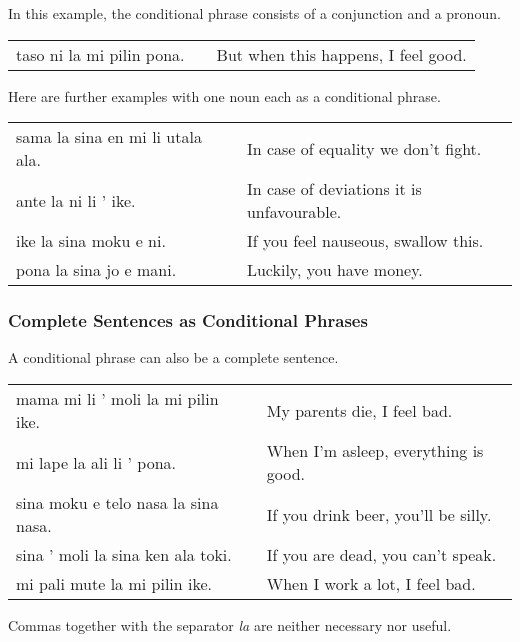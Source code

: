 In this example, the conditional phrase consists of a conjunction and a pronoun.

\begin{supertabular}{p{5,5cm}|ll}
    taso ni la mi pilin pona. &  & But when this happens, I feel good. \\
\end{supertabular}

Here are further examples with one noun each as a conditional phrase.

\begin{supertabular}{p{5,5cm}|ll}
    sama la sina en mi li utala ala. &  & In case of equality we don't fight.       \\
    ante la ni li ' ike.             &  & In case of deviations it is unfavourable. \\
    ike la sina moku e ni.           &  & If you feel nauseous, swallow this.       \\
    pona la sina jo e mani.          &  & Luckily, you have money.                  \\
\end{supertabular}

%
%
\subsubsection*{Complete Sentences as Conditional Phrases}
%
%
A conditional phrase can also be a complete sentence.

\begin{supertabular}{p{5,5cm}|ll}
    mama mi li ' moli la mi pilin ike.  &  & My parents die, I feel bad.          \\
    mi lape la ali li ' pona.           &  & When I'm asleep, everything is good. \\
    sina moku e telo nasa la sina nasa. &  & If you drink beer, you'll be silly.  \\
    sina ' moli la sina ken ala toki.   &  & If you are dead, you can't speak.    \\
    mi pali mute la mi pilin ike.       &  & When I work a lot, I feel bad.       \\
\end{supertabular}

Commas together with the separator \textit{la} are neither necessary nor useful.

